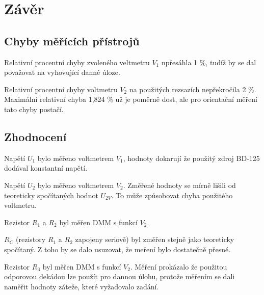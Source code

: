 \section{Závěr}
  \subsection{Chyby měřících přístrojů}
    Relativní procentní chyby zvoleného veltmetru $V_1$ npřesáhla 1 \%, tudíž by se dal považovat na vyhovující danné úloze.
  
    Relativní procentní chyby voltmetru $V_2$ na použitých rezsazích nepřekročila 2 \%. Maximální relativní chyba 1,824 \% už je poměrně dost, ale pro orientační měření tato chyby postačí.
  
  \subsection{Zhodnocení}
    Napětí $U_1$ bylo měřeno voltmetrem $V_1$, hodnoty dokarují že použitý zdroj BD-125 dodával konstantní napětí.

    Napětí $U_2$ bylo měřeno voltmetrem $V_2$. Změřené hodnoty se mírně lišili od teoreticky spočítaných hodnot $U_{2V}$. To může způsobovat chyba použitého voltmetru.

    Rezistor $R_1$ a $R_2$ byl měřen DMM s funkcí $V_2$.

    $R_C$ (rezistory $R_1$ a $R_2$ zapojeny seriově) byl změřen stejně jako teoreticky spočítaný. Z toho by se dalo usuzovat, že meření bylo dostatečně přesné.

    Rezistor $R_3$ byl měřen DMM s funkcí $V_2$. Měření prokázalo že použitou odporovou dekádou lze použít pro dannou úlohu, protože měřením se dali naměřit hodnoty záteže, které vyžadovalo zadání.
